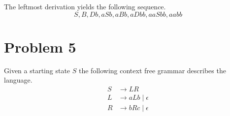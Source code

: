\documentclass[12pt]{article}
\begin{document}
The leftmost derivation yields the following sequence.
\[S, B, Db, aSb, aBb, aDbb, aaSbb, aabb\]

\section{Problem 5}

Given a starting state \(S\) the following context free grammar describes the language.
\begin{align*}
        S &\rightarrow LR\\
        L &\rightarrow aLb\mid\epsilon\\
        R &\rightarrow bRc\mid\epsilon\\
\end{align*}
\end{document}
